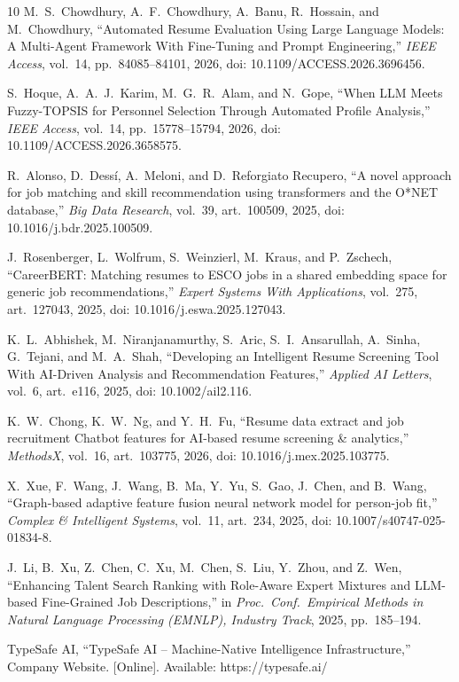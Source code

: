 \documentclass[journal]{IEEEtran}
\begin{document}
\begin{thebibliography}{10}
M.~S.~Chowdhury, A.~F.~Chowdhury, A.~Banu, R.~Hossain, and M.~Chowdhury, ``Automated Resume Evaluation Using Large Language Models: A Multi-Agent Framework With Fine-Tuning and Prompt Engineering,'' \emph{IEEE Access}, vol.~14, pp.~84085--84101, 2026, doi: 10.1109/ACCESS.2026.3696456.

S.~Hoque, A.~A.~J.~Karim, M.~G.~R.~Alam, and N.~Gope, ``When LLM Meets Fuzzy-TOPSIS for Personnel Selection Through Automated Profile Analysis,'' \emph{IEEE Access}, vol.~14, pp.~15778--15794, 2026, doi: 10.1109/ACCESS.2026.3658575.

R.~Alonso, D.~Dess\'i, A.~Meloni, and D.~Reforgiato Recupero, ``A novel approach for job matching and skill recommendation using transformers and the O*NET database,'' \emph{Big Data Research}, vol.~39, art.~100509, 2025, doi: 10.1016/j.bdr.2025.100509.

J.~Rosenberger, L.~Wolfrum, S.~Weinzierl, M.~Kraus, and P.~Zschech, ``CareerBERT: Matching resumes to ESCO jobs in a shared embedding space for generic job recommendations,'' \emph{Expert Systems With Applications}, vol.~275, art.~127043, 2025, doi: 10.1016/j.eswa.2025.127043.

K.~L.~Abhishek, M.~Niranjanamurthy, S.~Aric, S.~I.~Ansarullah, A.~Sinha, G.~Tejani, and M.~A.~Shah, ``Developing an Intelligent Resume Screening Tool With AI-Driven Analysis and Recommendation Features,'' \emph{Applied AI Letters}, vol.~6, art.~e116, 2025, doi: 10.1002/ail2.116.

K.~W.~Chong, K.~W.~Ng, and Y.~H.~Fu, ``Resume data extract and job recruitment Chatbot features for AI-based resume screening \& analytics,'' \emph{MethodsX}, vol.~16, art.~103775, 2026, doi: 10.1016/j.mex.2025.103775.

X.~Xue, F.~Wang, J.~Wang, B.~Ma, Y.~Yu, S.~Gao, J.~Chen, and B.~Wang, ``Graph-based adaptive feature fusion neural network model for person-job fit,'' \emph{Complex \& Intelligent Systems}, vol.~11, art.~234, 2025, doi: 10.1007/s40747-025-01834-8.

J.~Li, B.~Xu, Z.~Chen, C.~Xu, M.~Chen, S.~Liu, Y.~Zhou, and Z.~Wen, ``Enhancing Talent Search Ranking with Role-Aware Expert Mixtures and LLM-based Fine-Grained Job Descriptions,'' in \emph{Proc.\ Conf.\ Empirical Methods in Natural Language Processing (EMNLP), Industry Track}, 2025, pp.~185--194.

TypeSafe AI, ``TypeSafe AI -- Machine-Native Intelligence Infrastructure,'' Company Website. [Online]. Available: https://typesafe.ai/


\end{thebibliography}
\end{document}
